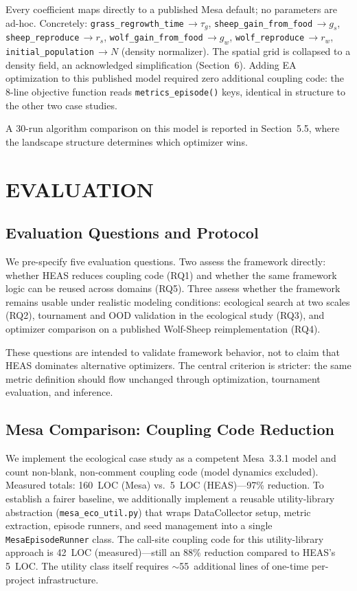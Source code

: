 \documentclass{wscpaperproc}
\begin{document}
Every coefficient maps directly to a published Mesa default; no parameters
are ad-hoc. Concretely: \texttt{grass\_regrowth\_time}\,$\to\!\tau_g$,
\texttt{sheep\_gain\_from\_food}\,$\to\!g_s$,
\texttt{sheep\_reproduce}\,$\to\!r_s$,
\texttt{wolf\_gain\_from\_food}\,$\to\!g_w$,
\texttt{wolf\_reproduce}\,$\to\!r_w$,
\texttt{initial\_population}\,$\to\!N$ (density normalizer). The spatial grid
is collapsed to a density field, an acknowledged simplification (Section~6).
Adding EA optimization to this published model required zero additional coupling
code: the 8-line objective function reads \texttt{metrics\_episode()} keys,
identical in structure to the other two case studies.

A 30-run algorithm comparison on this model is reported in Section~5.5,
where the landscape structure determines which optimizer wins.

\section{EVALUATION}

\subsection{Evaluation Questions and Protocol}

We pre-specify five evaluation questions. Two assess the framework directly:
whether HEAS reduces coupling code (RQ1) and whether the same framework logic
can be reused across domains (RQ5). Three assess whether the framework remains
usable under realistic modeling conditions: ecological search at two scales
(RQ2), tournament and OOD validation in the ecological study (RQ3), and
optimizer comparison on a published Wolf-Sheep reimplementation (RQ4).

These questions are intended to validate framework behavior, not to claim that
HEAS dominates alternative optimizers. The central criterion is stricter: the
same metric definition should flow unchanged through optimization, tournament
evaluation, and inference.

\subsection{Mesa Comparison: Coupling Code Reduction}
\label{sec:mesa-comparison}

We implement the ecological case study as a competent Mesa~3.3.1 model and
count non-blank, non-comment coupling code (model dynamics excluded).
Measured totals: 160~LOC (Mesa) vs.\ 5~LOC (HEAS)---97\% reduction.
To establish a fairer baseline, we additionally implement a reusable
utility-library abstraction (\texttt{mesa\_eco\_util.py}) that wraps
DataCollector setup, metric extraction, episode runners, and seed management
into a single \texttt{MesaEpisodeRunner} class. The call-site coupling code
for this utility-library approach is 42~LOC (measured)---still an 88\%
reduction compared to HEAS's 5~LOC. The utility class itself requires
$\sim$55~additional lines of one-time per-project infrastructure.
\end{document}
